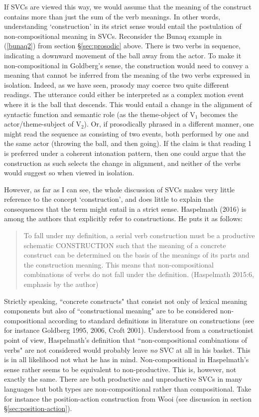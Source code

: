 If SVCs are viewed this way, we would assume that the meaning of the construct contains more than just the sum of the verb meanings. In other words, understanding `construction' in its strict sense would entail the postulation of non-compositional meaning in SVCs. Reconsider the Bunaq example in (\ref{bunaq2}) from section §\ref{sec:prosodic} above. There is two verbs in sequence, indicating a downward movement of the ball away from the actor. To make it non-compositional in Goldberg's sense, the construction would need to convey a meaning that cannot be inferred from the meaning of the two verbs expressed in isolation. Indeed, as we have seen, prosody may coerce two quite different readings. The utterance could either be interpreted as a complex motion event where it is the ball that descends. This would entail a change in the alignment of syntactic function and semantic role (as the theme-object of V$_1$ becomes the actor/theme-subject of V$_2$). Or, if prosodically phrased in a different manner, one might read the sequence as consisting of two events, both performed by one and the same actor (throwing the ball, and then going). If the claim is that reading 1 is preferred under a coherent intonation pattern, then one could argue that the construction as such selects the change in alignment, and neither of the verbs would suggest so when viewed in isolation.

However, as far as I can see, the whole discussion of SVCs makes very little reference to the concept `construction', and does little to explain the consequences that the term might entail in a strict sense. Haspelmath (2016) is among the authors that explicitly refer to constructions. He puts it as follows:

\begin{quote}To fall under my definition, a serial verb construction must be a productive schematic
CONSTRUCTION such that the meaning of a concrete construct can be determined on
the basis of the meanings of its parts and the construction meaning. This means that
non-compositional combinations of verbs do not fall under the definition. (Haspelmath 2015:6, emphasis by the author) \end{quote}

Strictly speaking, ``concrete constructs" that consist not only of lexical meaning components but also of ``constructional meaning" are to be considered non-compositional according to standard definitions in literature on constructions (see for instance Goldberg 1995, 2006, Croft 2001). Understood from a constructionist point of view, Haspelmath's definition that ``non-compositional combinations of verbs" are not considered would probably leave \emph{no} SVC at all in his basket. This is in all likelihood not what he has in mind. Non-compositional in Haspelmath's sense rather seems to be equivalent to non-productive. This is, however, not exactly the same. There are both productive and unproductive SVCs in many languages but both types are non-compositional rather than compositional. Take for instance the position-action construction from Wooi (see discussion in section §\ref{sec:position-action}).

